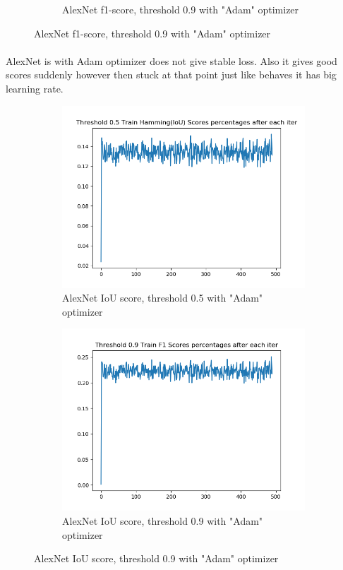 \documentclass[12pt]{article}
\begin{document}
\begin{figure}[!ht]
\begin{subfigure}{.5\textwidth}
	\caption{\label{alexnet:alexnet-lazy-adam-1_0-train-scores-f1-9}AlexNet f1-score, threshold 0.9 with "Adam" optimizer}
\end{subfigure}
\end{figure}
\paragraph{}AlexNet is with Adam optimizer does not give stable loss. Also it gives good scores suddenly however then stuck at that point just like behaves it has big learning rate.
\begin{figure}[!ht]
\centering
\begin{subfigure}{.5\textwidth}
	\centering
	\includegraphics[width=1\linewidth]{alexnet-lazy-adam-1_0-train-scores-hs-5.png}
	\caption{\label{alexnet:alexnet-lazy-adam-1_0-train-scores-hs-5}AlexNet IoU score, threshold 0.5 with "Adam" optimizer}
\end{subfigure}%
\begin{subfigure}{.5\textwidth}
	\centering
	\includegraphics[width=1\linewidth]{alexnet-lazy-adam-1_0-train-scores-f1-9.png}
	\caption{\label{alexnet:alexnet-lazy-adam-1_0-train-scores-hs-9}AlexNet IoU score, threshold 0.9 with "Adam" optimizer} 
\end{subfigure}
\end{figure}
\end{document}
